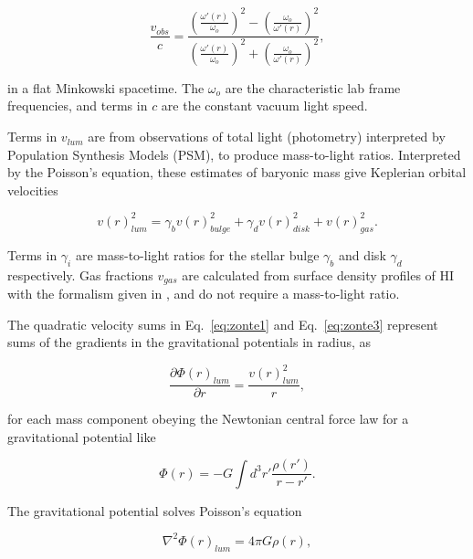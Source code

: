 \documentclass[reprint,%
 amsmath,amssymb,
 aps,
]{revtex4-1}
\begin{document}
 \begin{equation}
 \frac{v_{obs} }{c}=
\frac{  \left( \frac{\omega'(r)}{\omega_o}\right)^2 -  \left( \frac{\omega_o}{\omega'(r)} \right)^2 }{  \left( \frac{\omega'(r)}{\omega_o}\right)^2  +  \left( \frac{\omega_o}{\omega'(r)}\right)^2 },
\label{eq:modelLumA}
\end{equation} 

 in a flat Minkowski spacetime.  The $\omega_o$ are the
  characteristic lab  frame frequencies, and terms in $c$ are the constant vacuum light speed.  
  
  
 Terms in  $v_{lum}$ are from observations of total light  (photometry) interpreted by Population Synthesis Models (PSM), to produce mass-to-light ratios.    Interpreted by the  Poisson's equation,  these estimates of baryonic mass give Keplerian   orbital velocities 
  
   \begin{equation}
v(r)_{lum}^2 = \gamma_b v(r)_{bulge}^2 +  \gamma_d v(r)_{disk}^2 + v(r)_{gas}^2.    
\label{eq:zonte3}
\end{equation} 
  
 Terms in    $\gamma_i$  are   mass-to-light ratios for the stellar bulge $\gamma_b$ and disk $\gamma_d$ respectively.  Gas fractions $v_{gas}$ are calculated from surface density profiles of HI  with the formalism given in  \cite{1983MNRAS.203..735C}, and do not require  a mass-to-light ratio.  
  

The quadratic velocity sums in   Eq.~\ref{eq:zonte1} and Eq.~\ref{eq:zonte3}  represent  sums of the  gradients in the gravitational potentials in radius, as
 

\begin{equation}
 \frac{\partial \Phi(r)_{lum}}{\partial r}    =\frac{v(r)_{lum}^2}{r},  
    \label{zoochance1}
\end{equation}

  
for each mass component obeying the Newtonian central     force law for a gravitational potential like

\begin{equation}
      \Phi(r)  = -G \int d^3r'  \frac{ \rho(r') }{r-r'}.
      \label{eq:Newt}
      \end{equation}

The gravitational potential solves Poisson's equation

\begin{equation}
\nabla^2 \Phi(r)_{lum}  = 4\pi G \rho(r),     
    \label{whatsgood}
\end{equation}
\end{document}
